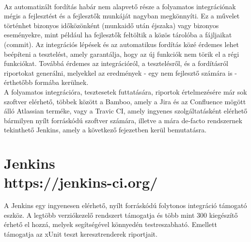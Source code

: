 \\
Az automatizált fordítás habár nem alapvető része a folyamatos integrációnak mégis a fejlesztést és a fejlesztők munkáját nagyban megkönnyíti. Ez a művelet történhet bizonyos időközönként (munkaidő után éjszaka) vagy bizonyos eseményekre, mint például ha fejlesztők feltöltik a közös tárolóba a fájljaikat (commit). Az integrációs lépések és az automatikus fordítás közé érdemes lehet beépíteni a tesztelést, amely garantálja, hogy az új funkciók nem törik el a régi funkciókat. Továbbá érdemes az integrációról, a tesztelésről, és a fordításról riportokat generálni, melyekkel az eredmények - egy nem fejlesztő számára is - érthetőbb formába kerülnek.
\\
A folyamatos integrációra, tesztesetek futtatására, riportok értelmezésére már sok szoftver elérhető, többek között a Bamboo, amely a Jira és az Confluence mögött álló Atlassian terméke, vagy a Travic CI, amely ingyenes szolgáltatásként elérhető bármilyen nyílt forráskódú szoftver számára, illetve a mára de-facto rendszernek tekinthető Jenkins, amely a következő fejezetben kerül bemutatásra.

\section{Jenkins\\\small{https://jenkins-ci.org/}}
A Jenkins egy ingyenesen elérhető, nyílt forráskódú folytonos integráció támogató eszköz. A legtöbb verziókezelő rendszert támogatja és több mint 300 kiegészítő érhető el hozzá, melyek segítségével könnyedén testreszabható. Emellett támogatja az xUnit teszt keresztrenderek riportjait.

